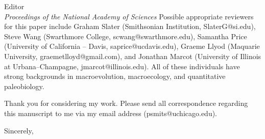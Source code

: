 \documentclass{letter}
\begin{document}
\begin{letter}{Editor \\ \textit{Proceedings of the National Academy of Sciences}}
  Possible appropriate reviewers for this paper include Graham Slater (Smithsonian Institution, SlaterG@si.edu), Steve Wang (Swarthmore College, scwang@swarthmore.edu), Samantha Price (University of California -- Davis, saprice@ucdavis.edu), Graeme Llyod (Maquarie University, graemetlloyd@gmail.com), and Jonathan Marcot (University of Illinois at Urbana--Champagne, jmarcot@illinois.edu). All of these individuals have strong backgrounds in macroevolution, macroecology, and quantitative paleobiology. 

  Thank you for considering my work. Please send all correspondence regarding this manuscript to me via my email address (psmits@uchicago.edu).

  \closing{Sincerely,}

\end{letter}
\end{document}
